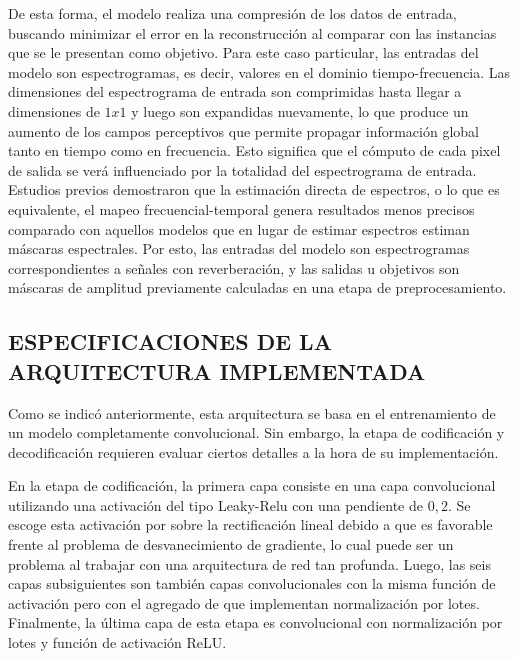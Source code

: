 De esta forma, el modelo realiza una compresión de los datos de entrada, buscando minimizar el error en la reconstrucción al comparar con las instancias que se le presentan como objetivo. 
Para este caso particular, las entradas del modelo son espectrogramas, es decir, valores en el dominio tiempo-frecuencia. Las dimensiones del espectrograma de entrada son comprimidas hasta llegar a dimensiones de $1x1$ y luego son expandidas nuevamente, lo que produce un aumento de los campos perceptivos que permite propagar información global tanto en tiempo como en frecuencia. Esto significa que el cómputo de cada pixel de salida se verá influenciado por la totalidad del espectrograma de entrada. Estudios previos demostraron que la estimación directa de espectros, o lo que es equivalente, el mapeo frecuencial-temporal genera resultados menos precisos comparado con aquellos modelos que en lugar de estimar espectros estiman máscaras espectrales\cite{mask_vs_map}. Por esto, las entradas del modelo son espectrogramas correspondientes a señales con reverberación, y las salidas u objetivos son máscaras de amplitud previamente calculadas en una etapa de preprocesamiento. 

\subsection[Especificaciones de la arquitectura implementada]{ESPECIFICACIONES DE LA ARQUITECTURA IMPLEMENTADA}

Como se indicó anteriormente, esta arquitectura se basa en el entrenamiento de un modelo completamente convolucional. Sin embargo, la etapa de codificación y decodificación requieren evaluar ciertos detalles a la hora de su implementación. 

En la etapa de codificación, la primera capa consiste en una capa convolucional utilizando una activación del tipo Leaky-Relu con una pendiente de $0,2$. Se escoge esta activación por sobre la rectificación lineal debido a que es favorable frente al problema de desvanecimiento de gradiente, lo cual puede ser un problema al trabajar con una arquitectura de red tan profunda. Luego, las seis capas subsiguientes son también capas convolucionales con la misma función de activación pero con el agregado de que implementan normalización por lotes. Finalmente, la última capa de esta etapa es convolucional con normalización por lotes y función de activación ReLU. 

